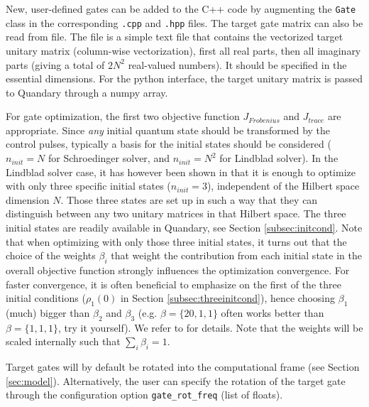\documentclass[11pt]{article}
\begin{document}
New, user-defined gates can be added to the C++ code by augmenting the \texttt{Gate} class in the corresponding \texttt{.cpp} and \texttt{.hpp} files.
The target gate matrix can also be read from file. The file is a simple text file that contains the vectorized target unitary matrix (column-wise vectorization), first all real parts, then all imaginary parts (giving a total of $2N^2$ real-valued numbers). It should be specified in the essential dimensions. 
For the python interface, the target unitary matrix is passed to Quandary through a numpy array.

For gate optimization, the first two objective function $J_{Frobenius}$ and $J_{trace}$ are appropriate. Since \textit{any} initial quantum state should be transformed by the control pulses, typically a basis for the initial states should be considered ($n_{init} = N$ for Schroedinger solver, and $n_{init}=N^2$ for Lindblad solver). In the Lindblad solver case, it has however been shown in \cite{goerz2014optimal} that it is enough to optimize with only three specific initial states ($n_{init} = 3$), independent of the Hilbert space dimension $N$. Those three states are set up in such a way that they can distinguish between any two unitary matrices in that Hilbert space. The three initial states are readily available in Quandary, see Section \ref{subsec:initcond}. Note that when optimizing with only those three initial states, it turns out that the choice of the weights $\beta_i$ that weight the contribution from each initial state in the overall objective function strongly influences the optimization convergence. For faster convergence, it is often beneficial to emphasize on the first of the three initial conditions ($\rho_1(0)$ in Section \ref{subsec:threeinitcond}), hence choosing $\beta_1$ (much) bigger than $\beta_2$ and $\beta_3$ (e.g. $\beta = \{20,1,1\}$ often works better than $\beta = \{1,1,1\}$, try it yourself). We refer to \cite{goerz2014optimal} for details. Note that the weights will be scaled internally such that $\sum_i \beta_i = 1$.

Target gates will by default be rotated into the computational frame (see Section \ref{sec:model}). Alternatively, the user can specify the rotation of the target gate through the configuration option \texttt{gate\_rot\_freq} (list of floats). 
\end{document}
